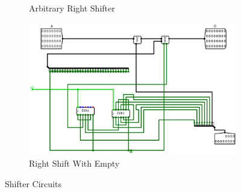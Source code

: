 \documentclass[12pt]{article}
\begin{document}
\begin{figure}[H]
\begin{subfigure}[b]{0.3\textwidth}
        \caption{Arbitrary Right Shifter}
        \label{fig:arbrightshift}
    \end{subfigure}
    \newline
    \newline
    \begin{subfigure}[b]{0.6\textwidth}
        \includegraphics[width=\textwidth]{Images/RightShiftWithEmpty.png}
        \caption{Right Shift With Empty}
        \label{fig:rightshiftwithempty}
    \end{subfigure}
    \caption{Shifter Circuits}\label{fig:shifter}
\end{figure}
\end{document}
